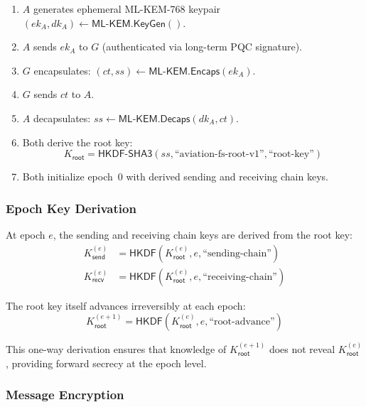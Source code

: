 \documentclass[conference,10pt]{IEEEtran}
\begin{document}
\begin{enumerate}
    \item $A$ generates ephemeral ML-KEM-768 keypair $(ek_A, dk_A) \leftarrow \mathsf{ML\text{-}KEM.KeyGen}()$.
    \item $A$ sends $ek_A$ to $G$ (authenticated via long-term PQC signature).
    \item $G$ encapsulates: $(ct, ss) \leftarrow \mathsf{ML\text{-}KEM.Encaps}(ek_A)$.
    \item $G$ sends $ct$ to $A$.
    \item $A$ decapsulates: $ss \leftarrow \mathsf{ML\text{-}KEM.Decaps}(dk_A, ct)$.
    \item Both derive the root key:
    \begin{equation}
        K_{\mathsf{root}} = \mathsf{HKDF\text{-}SHA3}(ss, \text{``aviation-fs-root-v1''}, \text{``root-key''})
    \end{equation}
    \item Both initialize epoch~0 with derived sending and receiving chain keys.
\end{enumerate}

\subsubsection{Epoch Key Derivation}

At epoch $e$, the sending and receiving chain keys are derived from the root key:
\begin{align}
    K_{\mathsf{send}}^{(e)} &= \mathsf{HKDF}(K_{\mathsf{root}}^{(e)}, e, \text{``sending-chain''}) \label{eq:send_chain} \\
    K_{\mathsf{recv}}^{(e)} &= \mathsf{HKDF}(K_{\mathsf{root}}^{(e)}, e, \text{``receiving-chain''}) \label{eq:recv_chain}
\end{align}

The root key itself advances irreversibly at each epoch:
\begin{equation}
    K_{\mathsf{root}}^{(e+1)} = \mathsf{HKDF}(K_{\mathsf{root}}^{(e)}, e, \text{``root-advance''})
\label{eq:root_advance}
\end{equation}

This one-way derivation ensures that knowledge of $K_{\mathsf{root}}^{(e+1)}$ does not reveal $K_{\mathsf{root}}^{(e)}$, providing forward secrecy at the epoch level.

\subsubsection{Message Encryption}
\end{document}

